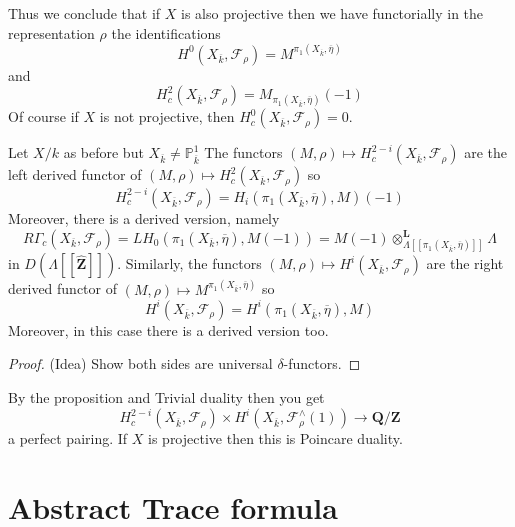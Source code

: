 \begin{remark}
\label{remark-projective}
Thus we conclude that if $X$ is also projective then
we have functorially in the representation $\rho$
the identifications
$$
H^0(X_{\overline k}, \mathcal{F}_\rho) =
M^{\pi_1(X_{\overline k}, \overline\eta)}
$$
and
$$
H_c^2(X_{\overline k}, \mathcal{F}_\rho) =
M_{\pi_1(X_{\overline k}, \overline \eta)}(-1)
$$
Of course if $X$ is not projective, then
$H^0_c(X_{\overline{k}}, \mathcal{F}_\rho) = 0$.
\end{remark}


\begin{proposition}
\label{proposition-curve-kpi1}
Let $X/k$ as before but $X_{\overline k}\neq \mathbb P^1_{\overline k}$
The functors
$
(M, \rho)\mapsto H_c^{2-i}(X_{\overline k}, \mathcal{F}_\rho)
$
are the left derived functor of
$(M, \rho)\mapsto H_c^2(X_{\overline k}, \mathcal{F}_\rho)$
so
$$
H_c^{2-i}(X_{\overline k},\mathcal{F}_\rho) =
H_i(\pi_1(X_{\overline k}, \overline \eta), M)(-1)
$$
Moreover, there is a derived version, namely
$$
R\Gamma_c(X_{\overline k}, \mathcal{F}_\rho)
=
LH_0(\pi_1(X_{\overline k}, \overline \eta), M(-1))
=
M(-1)
\otimes_{\Lambda[[\pi_1(X_{\overline k}, \overline \eta)]]}^\mathbf{L}
\Lambda
$$
in $D(\Lambda[[\widehat{\mathbf{Z}}]])$.
Similarly, the functors
$(M, \rho)\mapsto H^i(X_{\overline k}, \mathcal{F}_\rho)$
are the right derived functor of
$(M, \rho)\mapsto M^{\pi_1(X_{\overline k}, \overline \eta)}$
so
$$
H^i(X_{\overline k}, \mathcal{F}_\rho) =
H^i(\pi_1(X_{\overline k}, \overline \eta), M)
$$
Moreover, in this case there is a derived version too.
\end{proposition}

\begin{proof}
(Idea) Show both sides are universal $\delta$-functors.
\end{proof}

\begin{remark}
By the proposition and Trivial duality then you get
$$
H^{2-i}_c(X_{\overline k}, \mathcal{F}_\rho)
\times
H^i(X_{\overline k}, \mathcal{F}_\rho^\wedge(1))
\to
\mathbf{Q}/\mathbf{Z}
$$
a perfect pairing. If $X$ is projective then this is Poincare duality.
\end{remark}

\section{Abstract Trace formula}
\label{section-abstract-trace-formula}

